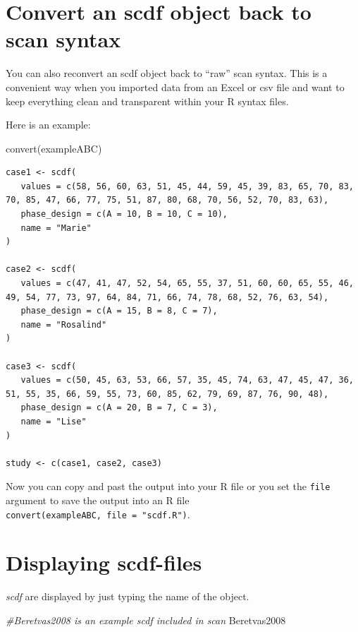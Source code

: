 \documentclass[
]{book}
\newenvironment{Shaded}{\begin{snugshade}}{\end{snugshade}}
\newcommand{\CommentTok}[1]{\textcolor[rgb]{0.56,0.35,0.01}{\textit{#1}}}
\newcommand{\FunctionTok}[1]{\textcolor[rgb]{0.00,0.00,0.00}{#1}}
\newcommand{\NormalTok}[1]{#1}
\begin{document}
\hypertarget{convert-an-scdf-object-back-to-scan-syntax}{%
\section{Convert an scdf object back to scan syntax}\label{convert-an-scdf-object-back-to-scan-syntax}}

You can also reconvert an scdf object back to ``raw'' scan syntax. This is a convenient way when you imported data from an Excel or csv file and want to keep everything clean and transparent within your R syntax files.

Here is an example:

\begin{Shaded}
\begin{Highlighting}[]
\FunctionTok{convert}\NormalTok{(exampleABC)}
\end{Highlighting}
\end{Shaded}

\begin{verbatim}
case1 <- scdf(
   values = c(58, 56, 60, 63, 51, 45, 44, 59, 45, 39, 83, 65, 70, 83, 70, 85, 47, 66, 77, 75, 51, 87, 80, 68, 70, 56, 52, 70, 83, 63), 
   phase_design = c(A = 10, B = 10, C = 10),
   name = "Marie"
)

case2 <- scdf(
   values = c(47, 41, 47, 52, 54, 65, 55, 37, 51, 60, 60, 65, 55, 46, 49, 54, 77, 73, 97, 64, 84, 71, 66, 74, 78, 68, 52, 76, 63, 54), 
   phase_design = c(A = 15, B = 8, C = 7),
   name = "Rosalind"
)

case3 <- scdf(
   values = c(50, 45, 63, 53, 66, 57, 35, 45, 74, 63, 47, 45, 47, 36, 51, 55, 35, 66, 59, 55, 73, 60, 85, 62, 79, 69, 87, 76, 90, 48), 
   phase_design = c(A = 20, B = 7, C = 3),
   name = "Lise"
)

study <- c(case1, case2, case3)
\end{verbatim}

Now you can copy and past the output into your R file or you set the \texttt{file} argument to save the output into an R file \texttt{convert(exampleABC,\ file\ =\ "scdf.R")}.

\hypertarget{displaying-scdf-files}{%
\section{Displaying scdf-files}\label{displaying-scdf-files}}

\emph{scdf} are displayed by just typing the name of the object.

\begin{Shaded}
\begin{Highlighting}[]
\CommentTok{\#Beretvas2008 is an example scdf included in scan}
\NormalTok{Beretvas2008}
\end{Highlighting}
\end{Shaded}
\end{document}
